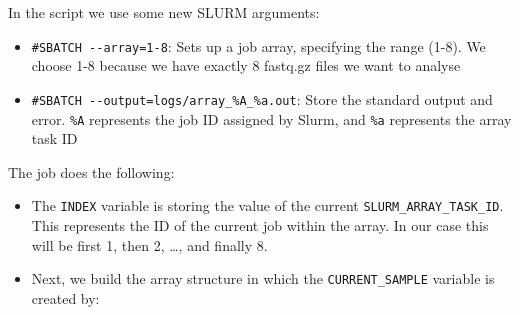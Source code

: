 \documentclass[
  letterpaper,
  DIV=11,
  numbers=noendperiod]{scrreprt}
\newenvironment{Shaded}{}{}
\newcommand{\AttributeTok}[1]{\textcolor[rgb]{0.84,0.23,0.29}{#1}}
\newcommand{\BuiltInTok}[1]{\textcolor[rgb]{0.84,0.23,0.29}{#1}}
\newcommand{\CommentTok}[1]{\textcolor[rgb]{0.42,0.45,0.49}{#1}}
\newcommand{\ExtensionTok}[1]{\textcolor[rgb]{0.84,0.23,0.29}{\textbf{#1}}}
\newcommand{\FunctionTok}[1]{\textcolor[rgb]{0.44,0.26,0.76}{#1}}
\newcommand{\KeywordTok}[1]{\textcolor[rgb]{0.84,0.23,0.29}{#1}}
\newcommand{\NormalTok}[1]{\textcolor[rgb]{0.14,0.16,0.18}{#1}}
\newcommand{\OperatorTok}[1]{\textcolor[rgb]{0.14,0.16,0.18}{#1}}
\newcommand{\PreprocessorTok}[1]{\textcolor[rgb]{0.84,0.23,0.29}{#1}}
\newcommand{\StringTok}[1]{\textcolor[rgb]{0.01,0.18,0.38}{#1}}
\newcommand{\VariableTok}[1]{\textcolor[rgb]{0.89,0.38,0.04}{#1}}
\providecommand{\tightlist}{%
  \setlength{\itemsep}{0pt}\setlength{\parskip}{0pt}}\usepackage{longtable,booktabs,array}
\begin{document}
\begin{tcolorbox}
\begin{Shaded}
\end{Shaded}

In the script we use some new SLURM arguments:

\begin{itemize}
\tightlist
\item
  \texttt{\#SBATCH\ -\/-array=1-8}: Sets up a job array, specifying the
  range (1-8). We choose 1-8 because we have exactly 8 fastq.gz files we
  want to analyse
\item
  \texttt{\#SBATCH\ -\/-output=logs/array\_\%A\_\%a.out}: Store the
  standard output and error. \texttt{\%A} represents the job ID assigned
  by Slurm, and \texttt{\%a} represents the array task ID
\end{itemize}

The job does the following:

\begin{itemize}
\tightlist
\item
  The \texttt{INDEX} variable is storing the value of the current
  \texttt{SLURM\_ARRAY\_TASK\_ID}. This represents the ID of the current
  job within the array. In our case this will be first 1, then 2,
  \ldots, and finally 8.
\item
  Next, we build the array structure in which the
  \texttt{CURRENT\_SAMPLE} variable is created by:


\end{itemize}
\end{tcolorbox}
\end{document}
